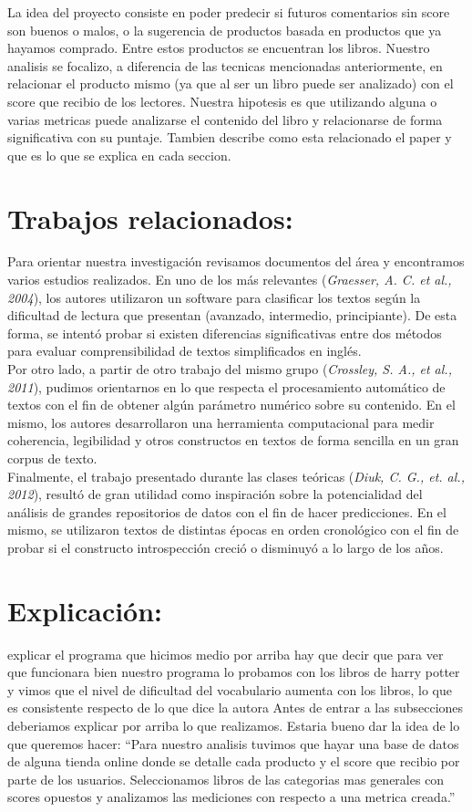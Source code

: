 \documentclass[12pt,journal,compsoc]{IEEEtran}
\begin{document}
La idea del proyecto consiste en poder predecir si futuros comentarios sin score son buenos o malos, o la sugerencia de productos basada en productos que ya hayamos comprado. Entre estos productos se encuentran los libros. Nuestro analisis se focalizo, a diferencia de las tecnicas mencionadas anteriormente, en relacionar el producto mismo (ya que al ser un libro puede ser analizado) con el score que recibio de los lectores. Nuestra hipotesis es que utilizando alguna o varias metricas puede analizarse el contenido del libro y relacionarse de forma significativa con su puntaje.
Tambien describe como esta relacionado el paper y que es lo que se explica en cada seccion.

\section{Trabajos relacionados:}

Para orientar nuestra investigación revisamos documentos del área y encontramos varios estudios realizados. En uno de los más relevantes (\textit{Graesser, A. C. et al., 2004}), los autores utilizaron un software para clasificar los textos según la dificultad de lectura que presentan (avanzado, intermedio, principiante). De esta forma, se intentó probar si existen diferencias significativas entre dos métodos para evaluar comprensibilidad de textos simplificados en inglés.\\
Por otro lado, a partir de otro trabajo del mismo grupo (\textit{Crossley, S. A., et al., 2011}), pudimos orientarnos en lo que respecta el procesamiento automático de textos con el fin de obtener algún parámetro numérico sobre su contenido. En el mismo, los autores desarrollaron una herramienta computacional para medir coherencia, legibilidad y otros constructos en textos de forma sencilla en un gran corpus de texto.\\
Finalmente, el trabajo presentado durante las clases teóricas (\textit{Diuk, C. G., et. al., 2012}), resultó de gran utilidad como inspiración sobre la potencialidad del análisis de grandes repositorios de datos con el fin de hacer predicciones. En el mismo, se utilizaron  textos de distintas épocas en orden cronológico con el fin de probar si el constructo introspección creció o disminuyó a lo largo de los años.

\section{Explicación:} 
explicar el programa que hicimos medio por arriba
hay que decir que para ver que funcionara bien nuestro programa lo probamos con los libros de harry potter y vimos que el nivel de dificultad del vocabulario aumenta con los libros, lo que es consistente respecto de lo que dice la autora
Antes de entrar a las subsecciones deberiamos explicar por arriba lo que realizamos. Estaria bueno dar la idea de lo que queremos hacer: ``Para nuestro analisis tuvimos que hayar una base de datos de alguna tienda online donde se detalle cada producto y el score que recibio por parte de los usuarios. Seleccionamos libros de las categorias mas generales con scores opuestos y analizamos las mediciones con respecto a una metrica creada.''
\end{document}
